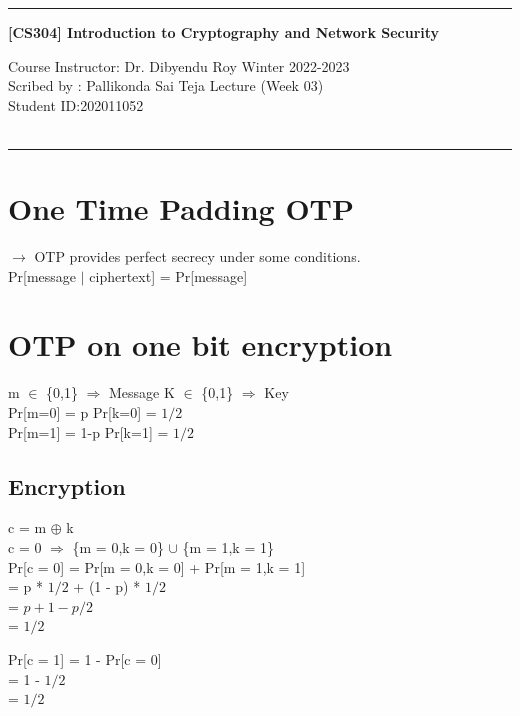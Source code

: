 \documentclass[11pt]{article}
\begin{document}
	\noindent
	\rule{\textwidth}{1pt}
	\begin{center}
		{\bf [CS304] Introduction to Cryptography and Network Security}
	\end{center}
	Course Instructor: Dr. Dibyendu Roy \hfill Winter 2022-2023\\
	Scribed by : Pallikonda Sai Teja  \hfill Lecture (Week 03)\\
	Student ID:202011052\\
	\\
	\rule{\textwidth}{1pt}
	\section{One Time Padding OTP}
	\flushleft $\rightarrow$ OTP provides perfect secrecy under some conditions.\\
	\centering Pr[message $|$ ciphertext] = Pr[message]
	\flushleft
	\section{OTP on one bit encryption}
	m $\in$ \{0,1\} $\Rightarrow$ Message \hspace{2cm} K $\in$ \{0,1\} $\Rightarrow$ Key\\
	Pr[m=0] = p \hspace{3.5cm} Pr[k=0] = $1/2$ \\
	Pr[m=1] = 1-p \hspace{3.2cm} Pr[k=1] = $1/2$\\
	
	\subsection{Encryption}
	c = m $\oplus$ k \\
	c = 0 $\Rightarrow$ \{m = 0,k = 0\} $\displaystyle \cup$ \{m = 1,k = 1\}\\
	Pr[c = 0] = Pr[m = 0,k = 0] + Pr[m = 1,k = 1]\\
	\hspace{1.7cm}= p * $1/2$ + (1 - p) * $1/2$ \\
	\hspace{1.7cm}= $p + 1 - p/2$\\
	\hspace{1.7cm}= $1/2$
	
	Pr[c = 1] = 1 - Pr[c = 0]\\
	\hspace{1.7cm}= 1 - $1/2$\\
	\hspace{1.7cm}= $1/2$
	
\end{document}
